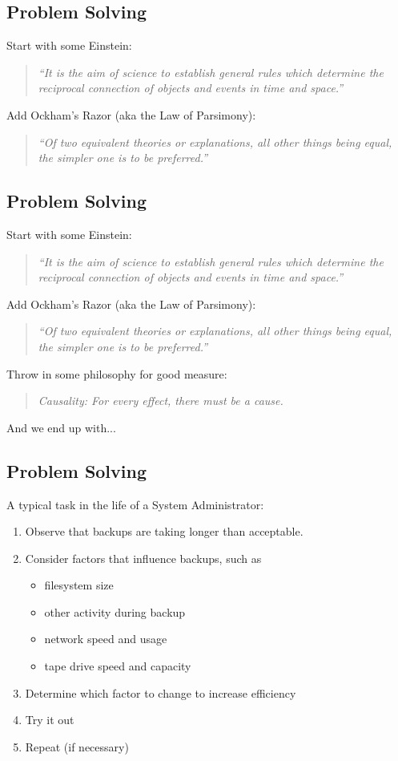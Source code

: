 \documentclass[xga]{xdvislides}
\begin{document}
\subsection{Problem Solving}
Start with some Einstein:
\begin{quote}
{\em ``It is the aim of science to establish general rules which determine the
reciprocal connection of objects and events in time and space.''}
\end{quote}
Add Ockham's Razor (aka the Law of Parsimony):
\begin{quote}
{\em ``Of two equivalent theories or explanations, all other things being
equal, the simpler one is to be preferred.''}
\end{quote}

\subsection{Problem Solving}
Start with some Einstein:
\begin{quote}
{\em ``It is the aim of science to establish general rules which determine the
reciprocal connection of objects and events in time and space.''}
\end{quote}
Add Ockham's Razor (aka the Law of Parsimony):
\begin{quote}
{\em ``Of two equivalent theories or explanations, all other things being
equal, the simpler one is to be preferred.''}
\end{quote}
Throw in some philosophy for good measure:
\begin{quote}
{\em Causality: For every effect, there must be a cause.}
\end{quote}

And we end up with...

\subsection{Problem Solving}
A typical task in the life of a System Administrator:

\begin{enumerate}
	\item Observe that backups are taking longer than acceptable.
	\item Consider factors that influence backups, such as
		\begin{itemize}
			\item filesystem size
			\item other activity during backup
			\item network speed and usage
			\item tape drive speed and capacity
		\end{itemize}
	\item Determine which factor to change to increase efficiency
	\item Try it out
	\item Repeat (if necessary)
\end{enumerate}
\end{document}
